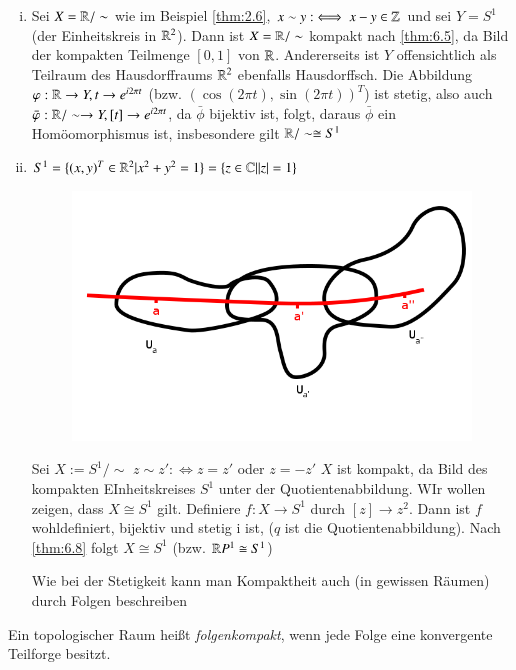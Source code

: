\documentclass[a4paper,10pt]{scrartcl}
\newcommand{\homo}{\cong}
\begin{document}
\begin{ex*}
 \begin{enumerate}[(i)]
  \item Sei $X=\mathbb{R}/\sim$ wie im Beispiel \ref{thm:2.6}, $x\sim y:\iff x-y\in \mathbb{Z}$ und sei $Y=S^1$ (der Einheitskreis in $\mathbb{R}^2$). Dann ist $X=\mathbb{R}/\sim$ kompakt nach \ref{thm:6.5}, da Bild der kompakten Teilmenge $[0,1]$ von $\mathbb{R}$. Andererseits ist $Y$ offensichtlich als Teilraum des Hausdorffraums $\mathbb{R}^2$ ebenfalls Hausdorffsch.
Die Abbildung $\varphi: \mathbb{R}\to Y, t\to e^{i2\pi t}$ (bzw. $(\cos(2\pi t), \sin(2\pi t))^T$) ist stetig, also auch $\bar {\varphi}: \mathbb{R}/\sim \to Y, [t]\to e^{i2\pi t}$, da $\bar \phi$ bijektiv ist, folgt, daraus $\bar \phi$ ein Homöomorphismus ist, insbesondere gilt $\R/\sim \homo S^1$

 \item $S^1=\{(x,y)^T\in \mathbb{R}^2|x^2+y^2=1\}=\{z\in \mathbb{C}||z|=1\}$\\
\begin{figure}[h]
\includegraphics[scale=0.5]{fig29.png}
\end{figure}
 Sei $X:=S^1/\sim$ $z\sim z':\iff z=z'$ oder $z=-z'$ $X$ ist kompakt, da Bild des kompakten EInheitskreises $S^1$ unter der Quotientenabbildung. WIr wollen zeigen, dass $X\homo S^{1}$ gilt. Definiere $f:X\to S^1$ durch $[z]\to z^2$. Dann ist $f$ wohldefiniert, bijektiv und stetig i
ist, ($q$ ist die Quotientenabbildung). Nach \ref{thm:6.8} folgt $X\homo S^1$ (bzw. $\R P^1\homo S^1$)

Wie bei der Stetigkeit kann man Kompaktheit auch (in gewissen Räumen) durch Folgen beschreiben
\end{enumerate}
\end{ex*}
\begin{df}\label{thm:6.9}
 Ein topologischer Raum heißt \emph{folgenkompakt}, wenn jede Folge eine konvergente Teilforge besitzt.  
\end{df}
\end{document}
